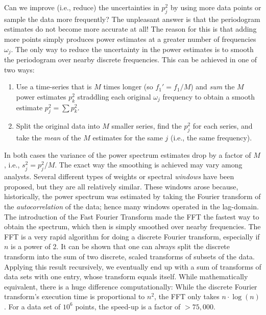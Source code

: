  	Can we improve (i.e., reduce) the uncertainties in $p^2_j$ by using more data points or sample the 
data more frequently?  The unpleasant answer is that the periodogram estimates do not become 
more accurate at all!  The reason for this is that adding more points simply produces power 
estimates at a greater number of frequencies $\omega_j$.  The only way to reduce the uncertainty in the 
power estimates is to smooth the periodogram over nearby discrete frequencies.  This can be 
achieved in one of two ways:

\begin{enumerate}
\item	Use a time-series that is $M$ times longer (so $f_1' = f_1/M$) and \emph{sum} the $M$ power estimates $p^2_k$
straddling each original $\omega_j$ frequency to obtain a smooth estimate $p^2_j = \sum p^2_k$.
\item	Split the original data into $M$ smaller series, find the $p^2_j$ for each series, and take the \emph{mean} of 
the $M$ estimates for the same $j$ (i.e., the same frequency).
\end{enumerate}
In both cases the variance of the power spectrum estimates drop by a factor of $M$, i.e., $s^2_j = p^2_j/M$.
The exact way the smoothing is achieved may vary among analysts.  Several different 
types of weights or spectral \emph{windows} have been proposed, but they are all relatively similar.  These windows 
arose because, historically, the power spectrum was estimated by taking the Fourier transform of 
the \emph{autocorrelation} of the data; hence many windows operated in the lag-domain.  The 
introduction of the Fast Fourier Transform made the FFT the fastest way to obtain the spectrum, 
which then is simply smoothed over nearby frequencies.  The FFT is a very rapid algorithm for 
doing a discrete Fourier transform, especially if $n$ is a power of 2.  It can be shown that one can 
always split the discrete transform into the sum of two discrete, scaled transforms of subsets of the data.  
Applying this result recursively, we eventually end up with a sum of transforms of data sets 
with one entry, whose transform equals itself.  While mathematically equivalent, there is a huge 
difference computationally:  While the discrete Fourier transform's execution time is proportional to $n^2$, 
the FFT only takes $n\cdot \log(n)$.  For a data set of $10^6$ points, the speed-up is a factor of $> 75,000$.


